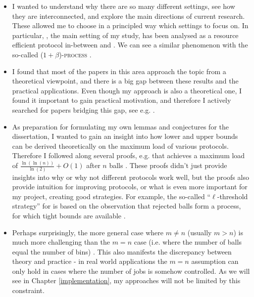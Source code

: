 \begin{itemize}
    \item 
    I wanted to understand why there are so many different settings, see how they are interconnected, and explore the main directions of current research. These allowed me to choose in a principled way which settings to focus on. In particular, \TwoThinning, the main setting of my study, has been analysed as a resource efficient protocol in-between \OneChoice and \TwoChoice. We can see a similar phenomenon with the so-called \textsc{($1+\beta$)-process} \cite{peres2015oneplusbeta}.
    \item
    I found that most of the papers in this area approach the topic from a theoretical viewpoint, and there is a big gap between these results and the practical applications. Even though my approach is also a theoretical one, I found it important to gain practical motivation, and therefore I actively searched for papers bridging this gap, see e.g. \cite{wang2017twochoicerouting}.
    \item
    As preparation for formulating my own lemmas and conjectures for the dissertation, I wanted to gain an insight into how lower and upper bounds can be derived theoretically on the maximum load of various protocols. Therefore I followed along several proofs, e.g. that \TwoChoice achieves a maximum load of $\frac{\ln(\ln(n))}{\ln(2)} + O(1)$ after $n$ balls \cite{azar1999twochoice}. These proofs didn't just provide insights into why or why not different protocols work well, but the proofs also provide intuition for improving protocols, or what is even more important for my project, creating good strategies. For example, the so-called ``{$\ell$}-threshold strategy'' for \TwoThinning is based on the observation that rejected balls form a \OneChoice process, for which tight bounds are available \cite{feldheim2021thinning}.
    \item
    Perhaps surprisingly, the more general case where $m\neq n$ (usually $m>n$) is much more challenging than the $m=n$ case (i.e. where the number of balls equal the number of bins) \cite{berenbrink2006heavilyloaded}. This also manifests the discrepancy between theory and practice - in real world applications the $m=n$ assumption can only hold in cases where the number of jobs is somehow controlled. As we will see in Chapter \ref{implementation}, my approaches will not be limited by this constraint.

\end{itemize}

